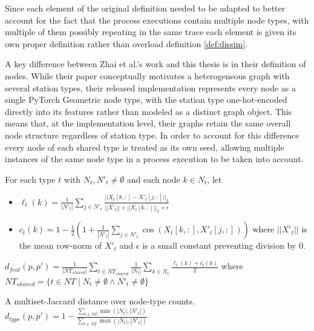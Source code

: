             Since each element of the original definition needed to be adapted to better account for the fact that the process executions contain multiple node types, with multiple of them possibly repeating in the same trace each element is given its own proper definition rather than overload definition \ref{def:dissim}.

            A key difference between Zhai et al.'s work and this thesis is in their definition of nodes. While their paper conceptually motivates a heterogeneous graph with several station types, their released implementation \cite{zhai2025} represents every node as a single PyTorch Geometric node type, with the station type one-hot-encoded directly into its features rather than modeled as a distinct graph object. This means that, at the implementation level, their graphs retain the same overall node structure regardless of station type. In order to account for this difference every node of each shared type is treated as its own seed, allowing multiple instances of the same node type in a process execution to be taken into account.

            \begin{definition}
            \label{def:feat_dissim}
            For each type $t$ with $N_t,N'_t \neq \emptyset$ and each node $k\in N_t$, let
            \begin{itemize} 
            \item $\ell_t(k)=\frac{1}{|N'_t|}\displaystyle\sum_{j\in N'_t} \frac{||X_t[k,:]-X'_t[j,:]||_2}{\overline{||X'_t||}+ ||X_t[k,:]||_2+\epsilon}$
            \item $c_t(k)=1-\frac{1}{2}(1+ \frac{1}{|N'_t|} \displaystyle\sum_{j \in N'_t}\cos(X_t[k,:], X'_t[j,:]))$ where $\overline{||X'_t||}$ is the mean row-norm of $X'_t$ and $\epsilon$ is a small constant preventing division by 0.
            \end{itemize}
            $d_{feat}(p,p')=\frac{1}{|NT_{shared}|}\displaystyle\sum_{t\in NT_{shared}} \frac{1}{|N_t|} \displaystyle\sum_{k\in N_t} \frac{\ell_t(k) + c_t(k)}{2}$
            where
              $NT_{shared}=\{ t\in NT \mid N_t \neq \emptyset \land N'_t\neq \emptyset\}$
            \end{definition}

            \begin{definition}
              \label{def:node_dissim}
                A multiset-Jaccard distance over node-type counts.
                $d_{type}(p,p')=1-\frac{\sum_{t\in NT}\min(|N_t|,|N'_t|)}{\sum_{t\in NT}\max(|N_t|,|N'_t|)}$
            \end{definition}

